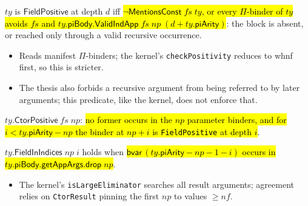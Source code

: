 \begin{definition}
\label{def:ind-field-positive}
\leanok
{} 

 $ty$ is $\mathsf{FieldPositive}$ at depth $d$ iff
\hl{$\neg\mathsf{MentionsConst}\;fs\;ty$, or every $\Pi$-binder of $ty$ avoids $fs$ and
$ty.\mathsf{piBody}.\mathsf{ValidIndApp}\;fs\;np\;(d+ty.\mathsf{piArity})$}: the block is
absent, or reached only through a valid recursive occurrence.
\begin{itemize}
\item {} Reads manifest $\Pi$-binders; the kernel's \texttt{checkPositivity}
 reduces to whnf first, so this is stricter.
\item The thesis also forbids a recursive argument from being referred to by later
arguments; this predicate, like the kernel, does not enforce that.
\end{itemize}
\end{definition}

\begin{definition}
\label{def:ind-ctor-positive}
\leanok
{} 

 $ty.\mathsf{CtorPositive}\;fs\;np$: \hl{no former occurs in the $np$
parameter binders, and for $i < ty.\mathsf{piArity}-np$ the binder at $np+i$ is
\texttt{FieldPositive} at depth $i$}.
\end{definition}

\begin{definition}
\label{def:ind-field-in-indices}
\leanok
{} 

 $ty.\mathsf{FieldInIndices}\;np\;i$ holds when
\hl{$\mathsf{bvar}\,(ty.\mathsf{piArity}-np-1-i)$ occurs in
$ty.\mathsf{piBody}.\mathsf{getAppArgs}.\mathsf{drop}\;np$}.
\begin{itemize}
\item The kernel's \texttt{isLargeEliminator} 
searches all result arguments; agreement relies on \texttt{CtorResult} pinning the first
$np$ to values $\ge nf$.
\end{itemize}
\end{definition}


